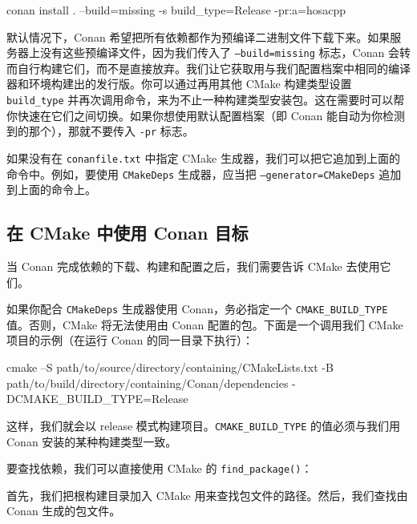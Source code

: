 \begin{codebox}[text]
conan install . --build=missing -s build_type=Release -pr:a=hosacpp
\end{codebox}

默认情况下，Conan 希望把所有依赖都作为预编译二进制文件下载下来。如果服务器上没有这些预编译文件，因为我们传入了 \texttt{--build=\allowbreak{}missing} 标志，Conan 会转而自行构建它们，而不是直接放弃。我们让它获取用与我们配置档案中相同的编译器和环境构建出的发行版。你可以通过再用其他 CMake 构建类型设置 \texttt{build\_\allowbreak{}type} 并再次调用命令，来为不止一种构建类型安装包。这在需要时可以帮你快速在它们之间切换。如果你想使用默认配置档案（即 Conan 能自动为你检测到的那个），那就不要传入 \texttt{-pr} 标志。

如果没有在 \texttt{conanfile.\allowbreak{}txt} 中指定 CMake 生成器，我们可以把它追加到上面的命令中。例如，要使用 \texttt{CMakeDeps} 生成器，应当把 \texttt{--generator=\allowbreak{}CMake\allowbreak{}Deps} 追加到上面的命令上。

\subsection{在 CMake 中使用 Conan 目标}

\label{idx:736}
当 Conan 完成依赖的下载、构建和配置之后，我们需要告诉 CMake 去使用它们。

如果你配合 \texttt{CMakeDeps} 生成器使用 Conan，务必指定一个 \texttt{CMAKE\_\allowbreak{}BUILD\_\allowbreak{}TYPE} 值。否则，CMake 将无法使用由 Conan 配置的包。下面是一个调用我们 CMake 项目的示例（在运行 Conan 的同一目录下执行）：

\begin{codebox}[text]
cmake –S path/to/source/directory/containing/CMakeLists.txt 
      -B path/to/build/directory/containing/Conan/dependencies
      -DCMAKE_BUILD_TYPE=Release
\end{codebox}

这样，我们就会以 release 模式构建项目。\texttt{CMAKE\_\allowbreak{}BUILD\_\allowbreak{}TYPE} 的值必须与我们用 Conan 安装的某种构建类型一致。

要查找依赖，我们可以直接使用 CMake 的 \texttt{find\_\allowbreak{}package(\allowbreak{})\allowbreak{}}：


首先，我们把根构建目录加入 CMake 用来查找包文件的路径。然后，我们查找由 Conan 生成的包文件。

